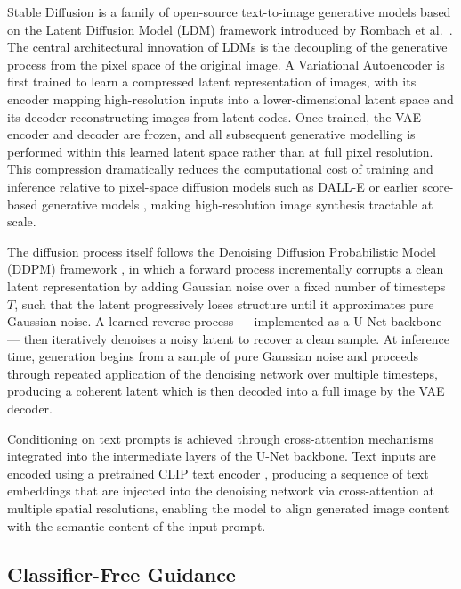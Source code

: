 Stable Diffusion is a family of open-source text-to-image generative models 
based on the Latent Diffusion Model (LDM) framework introduced by Rombach 
et al.\ \cite{Rombach_2022_CVPR}. The central architectural innovation of 
LDMs is the decoupling of the generative process from the pixel space of 
the original image. A Variational Autoencoder \cite{Kingma_2013_VAE} is 
first trained to learn a compressed latent representation of images, with 
its encoder mapping high-resolution inputs into a lower-dimensional latent 
space and its decoder reconstructing images from latent codes. Once trained, 
the VAE encoder and decoder are frozen, and all subsequent generative 
modelling is performed within this learned latent space rather than at full 
pixel resolution. This compression dramatically reduces the computational 
cost of training and inference relative to pixel-space diffusion models 
such as DALL-E \cite{Ramesh_2021_DALLE} or earlier score-based generative 
models \cite{Song_2020_ScoreMatching}, making high-resolution image 
synthesis tractable at scale.

The diffusion process itself follows the Denoising Diffusion Probabilistic 
Model (DDPM) framework \cite{Ho_2020_DDPM}, in which a forward process 
incrementally corrupts a clean latent representation by adding Gaussian 
noise over a fixed number of timesteps $T$, such that the latent 
progressively loses structure until it approximates pure Gaussian noise. 
A learned reverse process --- implemented as a U-Net 
\cite{Ronneberger_2015_UNet} backbone --- then iteratively denoises a 
noisy latent to recover a clean sample. At inference time, generation 
begins from a sample of pure Gaussian noise and proceeds through repeated 
application of the denoising network over multiple timesteps, producing a 
coherent latent which is then decoded into a full image by the VAE decoder.

Conditioning on text prompts is achieved through cross-attention mechanisms 
integrated into the intermediate layers of the U-Net backbone. Text inputs 
are encoded using a pretrained CLIP text encoder \cite{Radford_2021_CLIP}, 
producing a sequence of text embeddings that are injected into the 
denoising network via cross-attention at multiple spatial resolutions, 
enabling the model to align generated image content with the semantic 
content of the input prompt.

\subsection*{Classifier-Free Guidance}\label{subsec:cfg}

